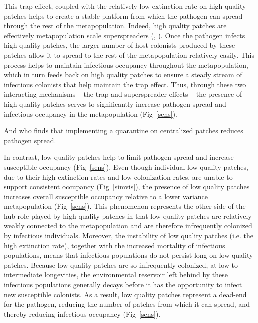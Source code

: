 \documentclass{svjour3}
\begin{document}
This trap effect, coupled with the relatively low extinction rate on high quality patches helps to create a stable platform from which the pathogen can spread through the rest of the metapopulation.  Indeed, high quality patches are effectively metapopulation scale superspreaders (\cite{Lloyd-Smith2005}, \cite{Paull2012}).  Once the pathogen infects high quality patches, the larger number of host colonists produced by these patches allow it to spread to the rest of the metapopulation relatively easily.  This process helps to maintain infectious occupancy throughout the metapopulation, which in turn feeds back on high quality patches to ensure a steady stream of infectious colonists that help maintain the trap effect.  Thus, through these two interacting mechanisms -- the trap and superspreader effects -- the presence of high quality patches serves to significantly increase pathogen spread and infectious occupancy in the metapopulation (Fig~\ref{sens}).  

And \cite{Hess1996} who finds that implementing a quarantine on centralized patches reduces pathogen spread.

In contrast, low quality patches help to limit pathogen spread and increase susceptible occupancy (Fig~\ref{sens}). Even though individual low quality patches, due to their high extinction rates and low colonization rates, are unable to support consistent occupancy (Fig~\ref{simvis}), the presence of low quality patches increases overall susceptible occupancy relative to a lower variance metapopulation (Fig~\ref{sens}).  This phenomenon represents the other side of the hub role played by high quality patches in that low quality patches are relatively weakly connected to the metapopulation and are therefore infrequently colonized by infectious individuals.  Moreover, the instability of low quality patches (i.e. the high extinction rate), together with the increased mortality of infectious populations, means that infectious populations do not persist long on low quality patches.  Because low quality patches are so infrequently colonized, at low to intermediate longevities, the environmental reservoir left behind by these infectious populations generally decays before it has the opportunity to infect new susceptible colonists.  As a result, low quality patches represent a dead-end for the pathogen, reducing the number of patches from which it can spread, and thereby reducing infectious occupancy (Fig~\ref{sens}).  
\end{document}
